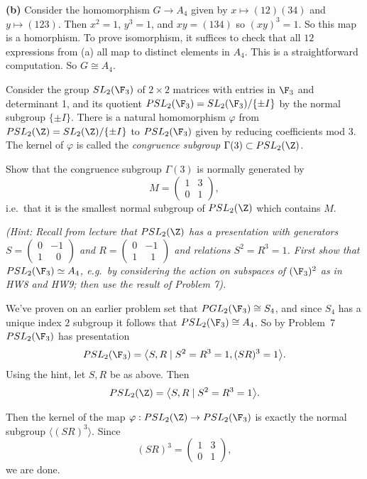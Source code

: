 \documentclass[11pt,letterpaper]{article}
\begin{document}
\textbf{(b)} Consider the homomorphism $G\to A_4$ given by $x\mapsto (12)(34)$ and $y\mapsto (123)$. Then $x^2=1$, $y^3=1$, and $xy=(134)$ so $(xy)^3=1$. So this map is a homorphism. To prove isomorphism, it suffices to check that all $12$ expressions from (a) all map to distinct elements in $A_4$. This is a straightforward computation. So $G\cong A_4$.

\pagebreak
\begin{problem} Consider the group $SL_2(\F_3)$ of $2\times 2$
matrices with entries in $\F_3$ and determinant 1, and its quotient
$PSL_2(\F_3)=SL_2(\F_3)/\{\pm I\}$ by the normal subgroup $\{\pm I\}$.
There is a natural homomorphism $\varphi$ from $PSL_2(\Z)=SL_2(\Z)/\{\pm I\}$ to
$PSL_2(\F_3)$ given by reducing coefficients mod 3. The kernel of $\varphi$
is called the {\em congruence subgroup} $\Gamma(3)\subset PSL_2(\Z)$.

Show that the congruence subgroup $\Gamma(3)$ is normally generated by 
$$M=\begin{pmatrix}1&3\\0&1\end{pmatrix},$$ i.e.\ that it is the smallest
normal subgroup of $PSL_2(\Z)$ which contains $M$.
\end{problem}

\textit{(Hint: Recall from lecture that $PSL_2(\Z)$ has a presentation with
generators 
$S=\left(\begin{smallmatrix}0&-1\\1&\ \,\,0\end{smallmatrix}\right)$ and
$R=\left(\begin{smallmatrix}0&-1\\1&\ \,\,1\end{smallmatrix}\right)$
and relations $S^2=R^3=1$.
First show that $PSL_2(\F_3)\simeq A_4$, e.g.\ by considering the
action on subspaces of $(\F_3)^2$ as in HW8 and HW9; then
use the result of Problem 7).}

We've proven on an earlier problem set that $PGL_2(\F_3)\cong S_4$, and since $S_4$ has a unique index $2$ subgroup it follows that $PSL_2(\F_3)\cong A_4$. So by Problem~7 $PSL_2(\F_3)$ has presentation
\[
    PSL_2(\F_3) = \big\langle S, R \mid S^2=R^3=1, (SR)^3=1 \big\rangle
.\] 
Using the hint, let $S,R$ be as above. Then
\[
    PSL_2(\Z) =\big\langle S, R \mid S^2=R^3=1 \big\rangle
.\] 

Then the kernel of the map $\varphi : PSL_2(\Z) \to PSL_2(\F_3)$ is exactly the normal subgroup $\big\langle (SR)^3 \big\rangle$. Since 
\[
    (SR)^3 = \begin{pmatrix}
        1&3\\ 0&1
    \end{pmatrix}
,\]
we are done.
\end{document}
